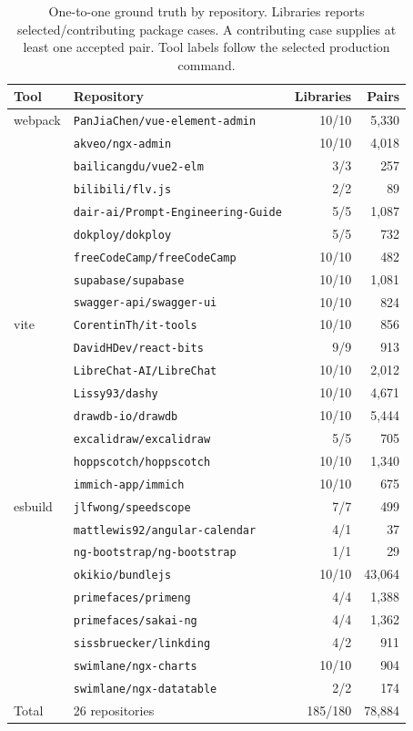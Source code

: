 \begin{table}[htbp]
\caption{One-to-one ground truth by repository. Libraries reports selected/contributing package cases. A contributing case supplies at least one accepted pair. Tool labels follow the selected production command.}
\label{tab:collection-repositories}
\centering\small
\begin{tabular}{@{}llrr@{}}
\toprule
Tool & Repository & Libraries & Pairs\\
\midrule
webpack & \nolinkurl{PanJiaChen/vue-element-admin} & 10/10 & 5,330\\
 & \nolinkurl{akveo/ngx-admin} & 10/10 & 4,018\\
 & \nolinkurl{bailicangdu/vue2-elm} & 3/3 & 257\\
 & \nolinkurl{bilibili/flv.js} & 2/2 & 89\\
 & \nolinkurl{dair-ai/Prompt-Engineering-Guide} & 5/5 & 1,087\\
 & \nolinkurl{dokploy/dokploy} & 5/5 & 732\\
 & \nolinkurl{freeCodeCamp/freeCodeCamp} & 10/10 & 482\\
 & \nolinkurl{supabase/supabase} & 10/10 & 1,081\\
 & \nolinkurl{swagger-api/swagger-ui} & 10/10 & 824\\
\addlinespace
vite & \nolinkurl{CorentinTh/it-tools} & 10/10 & 856\\
 & \nolinkurl{DavidHDev/react-bits} & 9/9 & 913\\
 & \nolinkurl{LibreChat-AI/LibreChat} & 10/10 & 2,012\\
 & \nolinkurl{Lissy93/dashy} & 10/10 & 4,671\\
 & \nolinkurl{drawdb-io/drawdb} & 10/10 & 5,444\\
 & \nolinkurl{excalidraw/excalidraw} & 5/5 & 705\\
 & \nolinkurl{hoppscotch/hoppscotch} & 10/10 & 1,340\\
 & \nolinkurl{immich-app/immich} & 10/10 & 675\\
\addlinespace
esbuild & \nolinkurl{jlfwong/speedscope} & 7/7 & 499\\
 & \nolinkurl{mattlewis92/angular-calendar} & 4/1 & 37\\
 & \nolinkurl{ng-bootstrap/ng-bootstrap} & 1/1 & 29\\
 & \nolinkurl{okikio/bundlejs} & 10/10 & 43,064\\
 & \nolinkurl{primefaces/primeng} & 4/4 & 1,388\\
 & \nolinkurl{primefaces/sakai-ng} & 4/4 & 1,362\\
 & \nolinkurl{sissbruecker/linkding} & 4/2 & 911\\
 & \nolinkurl{swimlane/ngx-charts} & 10/10 & 904\\
 & \nolinkurl{swimlane/ngx-datatable} & 2/2 & 174\\
\addlinespace
\midrule
Total & 26 repositories & 185/180 & 78,884\\
\bottomrule
\end{tabular}
\end{table}
